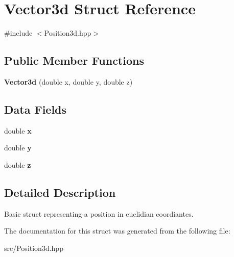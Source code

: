 \hypertarget{structVector3d}{}\section{Vector3d Struct Reference}
\label{structVector3d}


{\ttfamily \#include $<$Position3d.\+hpp$>$}

\subsection*{Public Member Functions}
\begin{DoxyCompactItemize}
\item 
\mbox{\label{structVector3d_a2af71ff755b2d4aa4e73eb0a30dc103a}} 
{\bfseries Vector3d} (double x, double y, double z)
\end{DoxyCompactItemize}
\subsection*{Data Fields}
\begin{DoxyCompactItemize}
\item 
\mbox{\label{structVector3d_afafd0a4e0eebb0baa1e35f9d8c98634a}} 
double {\bfseries x}
\item 
\mbox{\label{structVector3d_a53c889dcd72f16bc0f21c15bb4e8a7ef}} 
double {\bfseries y}
\item 
\mbox{\label{structVector3d_acda14a15e061a330d4ada509c9357c30}} 
double {\bfseries z}
\end{DoxyCompactItemize}


\subsection{Detailed Description}
Basic struct representing a position in euclidian coordiantes. 

The documentation for this struct was generated from the following file\+:\begin{DoxyCompactItemize}
\item 
src/Position3d.\+hpp\end{DoxyCompactItemize}
